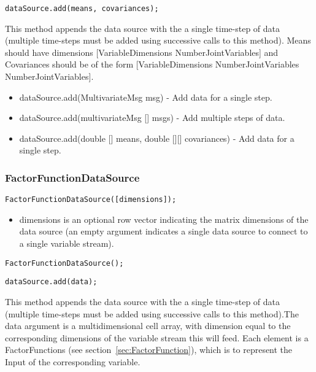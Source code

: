 

\ifmatlab
\begin{lstlisting}
dataSource.add(means, covariances);
\end{lstlisting}

This method appends the data source with the a single time-step of data (multiple time-steps must be added using successive calls to this method).  Means should have dimensions [VariableDimensions NumberJointVariables] and Covariances should be of the form [VariableDimensions NumberJointVariables NumberJointVariables].
\fi

\ifjava
\begin{itemize}
\item dataSource.add(MultivariateMsg msg) - Add data for a single step.
\item dataSource.add(multivariateMsg [] msgs) - Add multiple steps of data.
\item dataSource.add(double [] means, double [][] covariances) - Add data for a single step.
\end{itemize}
\fi


\subsubsection{FactorFunctionDataSource}


\ifmatlab
\begin{lstlisting}
FactorFunctionDataSource([dimensions]);
\end{lstlisting}

\begin{itemize}
\item dimensions is an optional row vector indicating the matrix dimensions of the data source (an empty argument indicates a single data source to connect to a single variable stream).
\end{itemize}
\fi

\ifjava
\begin{lstlisting}
FactorFunctionDataSource();
\end{lstlisting}
\fi




\begin{lstlisting}
dataSource.add(data);
\end{lstlisting}

This method appends the data source with the a single time-step of data (multiple time-steps must be added using successive calls to this method).The data argument is a multidimensional \ifmatlab cell \fi array, with dimension equal to the corresponding dimensions of the variable stream this will feed.  Each element is a FactorFunctions (see section~\ref{sec:FactorFunction}), which is to represent the Input of the corresponding variable.


